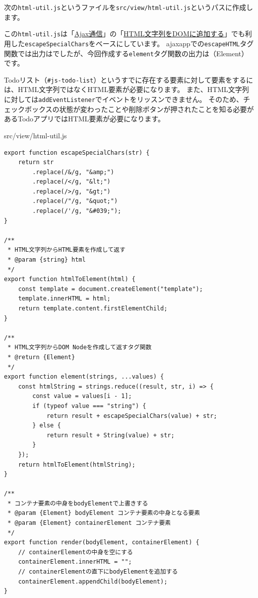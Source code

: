次の\texttt{html-util.js}というファイルを\texttt{src/view/html-util.js}というパスに作成します。

この\texttt{html-util.js}は「\hyperlink{usecase-ajax}{Ajax通信}」の「\hyperlink{html-to-dom}{HTML文字列をDOMに追加する}」でも利用した\texttt{escapeSpecialChars}をベースにしています。
ajaxappでの\texttt{escapeHTML}タグ関数では出力は\textbf{}でしたが、今回作成する\texttt{element}タグ関数の出力は\textbf{}（Element）です。

Todoリスト（\texttt{\#js-todo-list}）というすでに存在する要素に対して要素を\textbf{}するには、HTML文字列ではなくHTML要素が必要になります。
また、HTML文字列に対しては\texttt{addEventListener}でイベントをリッスンできません。
そのため、チェックボックスの状態が変わったことや削除ボタンが押されたことを知る必要があるTodoアプリではHTML要素が必要になります。

\begin{listtitle}
src/view/html-util.js
\end{listtitle}
\begin{lstlisting}
export function escapeSpecialChars(str) {
    return str
        .replace(/&/g, "&amp;")
        .replace(/</g, "&lt;")
        .replace(/>/g, "&gt;")
        .replace(/"/g, "&quot;")
        .replace(/'/g, "&#039;");
}

/**
 * HTML文字列からHTML要素を作成して返す
 * @param {string} html 
 */
export function htmlToElement(html) {
    const template = document.createElement("template");
    template.innerHTML = html;
    return template.content.firstElementChild;
}

/**
 * HTML文字列からDOM Nodeを作成して返すタグ関数
 * @return {Element}
 */
export function element(strings, ...values) {
    const htmlString = strings.reduce((result, str, i) => {
        const value = values[i - 1];
        if (typeof value === "string") {
            return result + escapeSpecialChars(value) + str;
        } else {
            return result + String(value) + str;
        }
    });
    return htmlToElement(htmlString);
}

/**
 * コンテナ要素の中身をbodyElementで上書きする
 * @param {Element} bodyElement コンテナ要素の中身となる要素
 * @param {Element} containerElement コンテナ要素
 */
export function render(bodyElement, containerElement) {
    // containerElementの中身を空にする
    containerElement.innerHTML = "";
    // containerElementの直下にbodyElementを追加する
    containerElement.appendChild(bodyElement);
}
\end{lstlisting}
\listend

